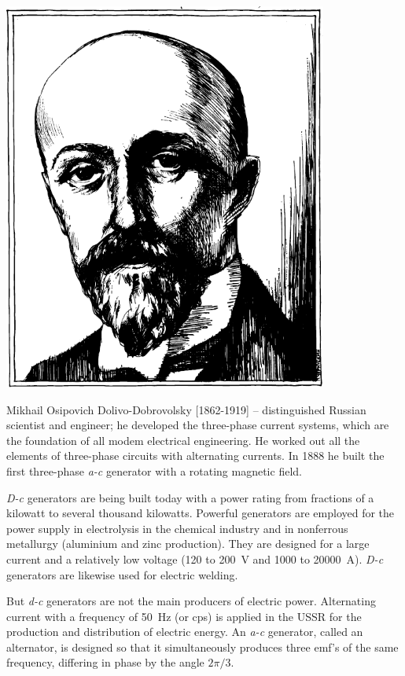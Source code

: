 \begin{center}
\includegraphics[width=0.8\textwidth]{figures/dobrovosky.pdf}
\end{center}
{\small \textsf{{Mikhail Osipovich Dolivo-Dobrovolsky [1862-1919]}} -- \textsf{\footnotesize distinguished Russian scientist and engineer; he developed the three-phase current systems, which are the foundation of all modem electrical engineering. He worked out all the elements of three-phase circuits with alternating currents. In 1888 he built the first three-phase \emph{a-c} generator with a rotating magnetic field.}}


\emph{D-c} generators are being built today with a power rating from fractions of a kilowatt to several thousand kilowatts. Powerful generators are employed for the power supply in electrolysis in the chemical industry and in nonferrous metallurgy (aluminium and zinc production). They are designed for a large current and a relatively low voltage (120 to \SI{200}{\volt} and 1000 to \SI{20000}{\ampere}). \emph{D-c} generators are likewise used for electric welding.


But \emph{d-c} generators are not the main producers of electric power. Alternating current with a frequency of \SI{50}{\hertz} (or cps) is applied in the USSR for the production and distribution of electric energy. An \emph{a-c} generator, called an alternator, is designed so that it simultaneously produces three emf's of the same frequency, differing in phase by the angle $2\pi/3$.

